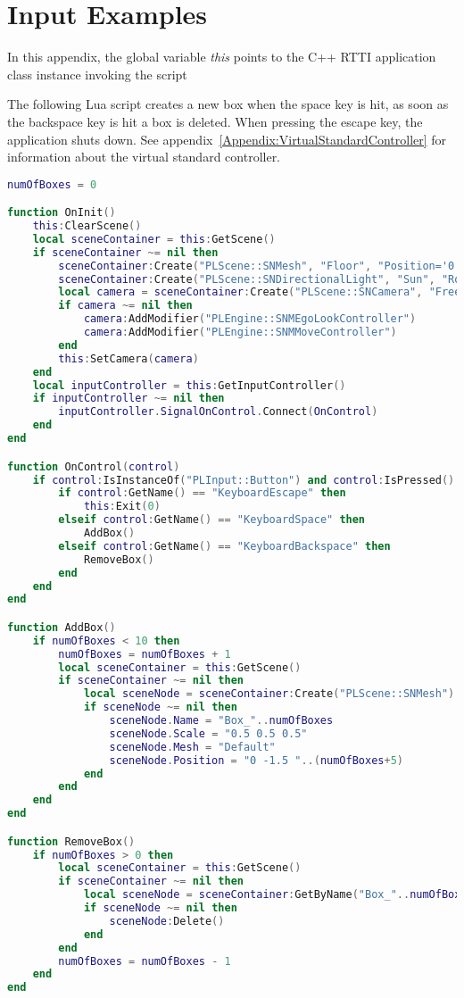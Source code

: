 \chapter{Input Examples}
\label{Appendix:InputExamples}
In this appendix, the global variable \emph{this} points to the C++ \ac{RTTI} application class instance invoking the script 

The following Lua script creates a new box when the space key is hit, as soon as the backspace key is hit a box is deleted. When pressing the escape key, the application shuts down. See appendix~\ref{Appendix:VirtualStandardController} for information about the virtual standard controller.

\begin{lstlisting}[language=lua]
numOfBoxes = 0

function OnInit()
	this:ClearScene()
	local sceneContainer = this:GetScene()
	if sceneContainer ~= nil then
		sceneContainer:Create("PLScene::SNMesh", "Floor", "Position='0 -2.1 5' Scale='4 0.1 4' Rotation='0 180 0' Mesh='Default'")
		sceneContainer:Create("PLScene::SNDirectionalLight", "Sun", "Rotation='45 0 0'")
		local camera = sceneContainer:Create("PLScene::SNCamera", "FreeCamera")
		if camera ~= nil then
			camera:AddModifier("PLEngine::SNMEgoLookController")
			camera:AddModifier("PLEngine::SNMMoveController")
		end
		this:SetCamera(camera)
	end
	local inputController = this:GetInputController()
	if inputController ~= nil then
		inputController.SignalOnControl.Connect(OnControl)
	end
end

function OnControl(control)
	if control:IsInstanceOf("PLInput::Button") and control:IsPressed() then
		if control:GetName() == "KeyboardEscape" then
			this:Exit(0)
		elseif control:GetName() == "KeyboardSpace" then
			AddBox()
		elseif control:GetName() == "KeyboardBackspace" then
			RemoveBox()
		end
	end
end

function AddBox()
	if numOfBoxes < 10 then
		numOfBoxes = numOfBoxes + 1
		local sceneContainer = this:GetScene()
		if sceneContainer ~= nil then
			local sceneNode = sceneContainer:Create("PLScene::SNMesh")
			if sceneNode ~= nil then
				sceneNode.Name = "Box_"..numOfBoxes
				sceneNode.Scale = "0.5 0.5 0.5"
				sceneNode.Mesh = "Default"
				sceneNode.Position = "0 -1.5 "..(numOfBoxes+5)
			end
		end
	end
end

function RemoveBox()
	if numOfBoxes > 0 then
		local sceneContainer = this:GetScene()
		if sceneContainer ~= nil then
			local sceneNode = sceneContainer:GetByName("Box_"..numOfBoxes)
			if sceneNode ~= nil then
				sceneNode:Delete()
			end
		end
		numOfBoxes = numOfBoxes - 1
	end
end
\end{lstlisting}

